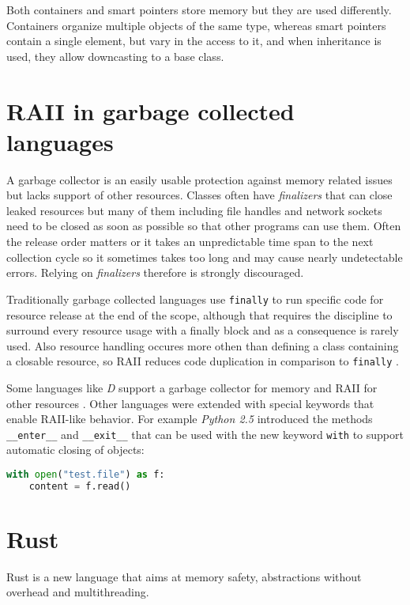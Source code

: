 \documentclass[conference,twocolumn]{IEEEtran}
\begin{document}
Both containers and smart pointers store memory but they are used differently. Containers organize multiple objects of the same type, whereas smart pointers contain a single element, but vary in the access to it, and when inheritance is used, they allow downcasting to a base class.


\section{RAII in garbage collected languages}
A garbage collector is an easily usable protection against memory related issues but lacks support of other resources. Classes often have \emph{finalizers} that can close leaked resources but many of them including file handles and network sockets need to be closed as soon as possible so that other programs can use them. Often the release order matters or it takes an unpredictable time span to the next collection cycle so it sometimes takes too long and may cause nearly undetectable errors. Relying on \emph{finalizers} therefore is strongly discouraged.

Traditionally garbage collected languages use \verb|finally| to run specific code for resource release at the end of the scope, although that requires the discipline to surround every resource usage with a finally block and as a consequence is rarely used. Also resource handling occures more othen than defining a class containing a closable resource, so RAII reduces code duplication in comparison to \verb|finally| \cite{isoCppFAQ}.

Some languages like \emph{D} support a garbage collector for memory and RAII for other resources \cite{DLangProgramming}. Other languages were extended with special keywords that enable RAII-like behavior. For example \emph{Python 2.5} \cite{pythonDoc} introduced the methods \verb|__enter__| and \verb|__exit__| that can be used with the new keyword \verb|with| to support automatic closing of objects:
\begin{lstlisting}[language=python,frame=single]
with open("test.file") as f:
    content = f.read()
\end{lstlisting}


\section{Rust}
Rust is a new language that aims at memory safety, abstractions without overhead and multithreading. \cite{RustBook}
\end{document}
